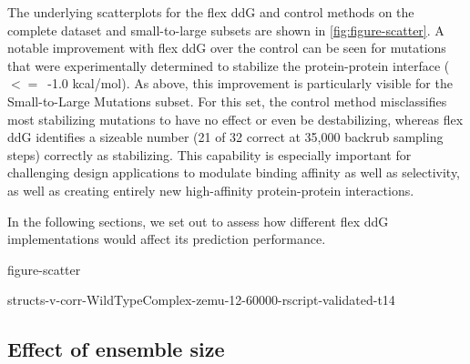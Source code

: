 The underlying scatterplots for the flex ddG and control methods on the complete dataset and small-to-large subsets are shown in \cref{fig:figure-scatter}. A notable improvement with flex ddG over the control can be seen for mutations that were experimentally determined to stabilize the protein-protein interface (\ddg\ $<=$\ -1.0 kcal/mol). As above, this improvement is particularly visible for the Small-to-Large Mutations subset. For this set, the control method misclassifies most stabilizing mutations to have no effect or even be destabilizing, whereas flex ddG identifies a sizeable number (21 of 32 correct at 35,000 backrub sampling steps) correctly as stabilizing. This capability is especially important for challenging design applications to modulate binding affinity as well as selectivity, as well as creating entirely new high-affinity protein-protein interactions.

In the following sections, we set out to assess how different flex ddG implementations would affect its prediction performance.

{figure-scatter}

{structs-v-corr-WildTypeComplex-zemu-12-60000-rscript-validated-t14}

\subsection{Effect of ensemble size}

